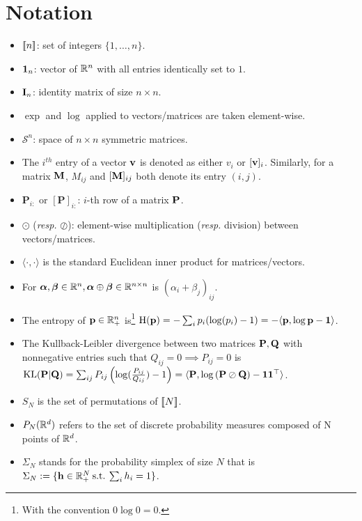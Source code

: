 \section*{Notation}

\begin{itemize}
	\item ${[\![n]\!]}$: set of integers $\{1,\dots,n\}$.
	\item $\bm{1}_{n}$: vector of $\mathbb{R}^{n}$ with all entries identically set to $1$.
	\item ${\mathbf{I}}_n$: identity matrix of size $n \times n$.
    \item $\exp$ and $\log$ applied to vectors/matrices are taken element-wise.
    \item $\mathcal{S}^n$: space of $n \times n$ symmetric matrices.
    \item The $i^{th}$ entry of a vector ${\mathbf{v}}$ is denoted as either $v_i$ or $[{\mathbf{v}}]_i$.
	Similarly, for a matrix ${\mathbf{M}}$, $M_{ij}$ and $[{\mathbf{M}}]_{ij}$ both denote its entry $(i,j)$.
    \item $\mathbf{P}_{i:}$ or $[\mathbf{P}]_{i:}$: $i$-th row of a matrix $\mathbf{P}$.
    \item $\odot$ (\textit{resp.} $\oslash$): element-wise multiplication (\textit{resp.} division) between vectors/matrices.
    \item $\langle \cdot, \cdot \rangle$ is the standard Euclidean inner product for matrices/vectors.
    \item For $\bm{\alpha}, \bm{\beta} \in \mathbb{R}^n, \bm{\alpha} \oplus \bm{\beta} \in \mathbb{R}^{n \times n}$ is $(\alpha_i + \beta_j)_{ij}$.
    \item The entropy of $\mathbf{p} \in \mathbb{R}^{n}_+$ is\footnote{With the convention $0 \log 0 = 0$.} $\operatorname{H}(\mathbf{p}) = -\sum_{i} p_i(\log(p_i)-1) = -\langle \mathbf{p}, \log \mathbf{p} - \bm{1} \rangle$.
    \item The Kullback-Leibler divergence between two matrices $\mathbf{P}, \mathbf{Q}$ with nonnegative entries such that $Q_{ij} = 0 \implies P_{ij}=0$ is $\operatorname{KL}(\mathbf{P} | \mathbf{Q}) = \sum_{ij} P_{ij}\left(\log(\frac{P_{ij}}{Q_{ij}})-1\right) = \langle \mathbf{P}, \log \left(\mathbf{P} \oslash \mathbf{Q} \right) - \bm{1}\bm{1}^\top \rangle$.
    \item $S_N$ is the set of permutations of ${[\![N]\!]}$.
    \item $P_N(\mathbb{R}^d)$ refers to the set of discrete probability measures composed of N points of $\mathbb{R}^d$.
    \item $\Sigma_N$ stands for the probability simplex of size $N$ that is $\Sigma_N := \{{\mathbf{h}} \in \mathbb{R}^N_+ \: \text{s.t.} \: \sum_i h_i = 1 \}$.

\end{itemize}
